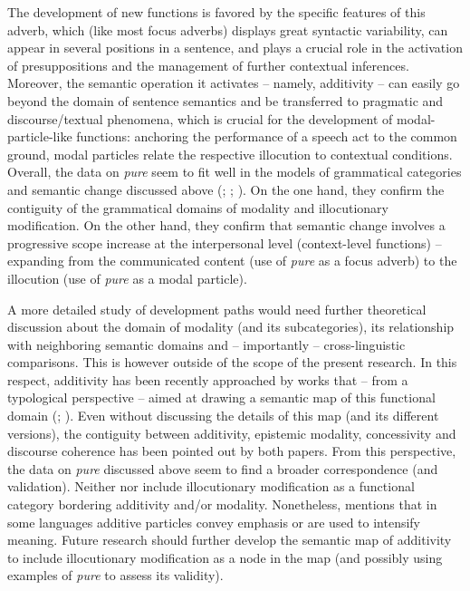 The development of new functions is favored by the specific features of this adverb, which (like most focus adverbs) displays great syntactic variability, can appear in several positions in a sentence, and plays a crucial role in the activation of presuppositions and the management of further contextual inferences. Moreover, the semantic operation it activates – namely, additivity – can easily go beyond the domain of sentence semantics and be transferred to pragmatic and discourse/textual phenomena, which is crucial for the development of modal-particle-like functions: anchoring the performance of a speech act to the common ground, modal particles relate the respective illocution to contextual conditions. Overall, the data on \textit{pure} seem to fit well in the models of grammatical categories and semantic change discussed above (\citealt{Hengeveld2004,Hengeveld2017}; \citealt{Narrog2012,Narrog2017}; \citealt{TraugottDasher2002}). On the one hand, they confirm the contiguity of the grammatical domains of modality and illocutionary modification. On the other hand, they confirm that semantic change involves a progressive scope increase at the interpersonal level (context-level functions) – expanding from the communicated content (use of \textit{pure} as a focus adverb) to the illocution (use of \textit{pure} as a modal particle).

A more detailed study of development paths would need further theoretical discussion about the domain of modality (and its subcategories), its relationship with neighboring semantic domains and – importantly – cross-linguistic comparisons. This is however outside of the scope of the present research. In this respect, additivity has been recently approached by works that – from a typological perspective – aimed at drawing a semantic map of this functional domain (\citealt{Forker2016}; \citealt{Faller2020}). Even without discussing the details of this map (and its different versions), the contiguity between additivity, epistemic modality, concessivity and discourse coherence has been pointed out by both papers. From this perspective, the data on \textit{pure} discussed above seem to find a broader correspondence (and validation). Neither \citet{Forker2016} nor \citet{Faller2020} include illocutionary modification as a functional category bordering additivity and/or modality. Nonetheless, \citet[85]{Forker2016} mentions that in some languages additive particles convey emphasis or are used to intensify meaning. Future research should further develop the semantic map of additivity to include illocutionary modification as a node in the map (and possibly using examples of \textit{pure} to assess its validity).

